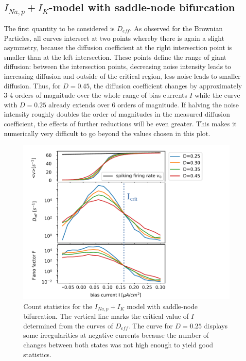 \documentclass[12pt,a4paper]{article}
\begin{document}
\subsection{$I_{Na,p}+I_K$-model with saddle-node bifurcation}
The first quantity to be considered is $D_{eff}$.
As observed for the Brownian Particles, all curves intersect at two points whereby there is again a slight asymmetry, because the diffusion coefficient at the right intersection point is smaller than at the left intersection. These points define the range of giant diffusion: between the intersection points, decreasing noise intensity leads to increasing diffusion and outside of the critical region, less noise leads to smaller diffusion. Thus, for $D=0.45$, the diffusion coefficient changes by approximately 3-4 orders of magnitude over the whole range of bias currents $I$ while the curve with $D=0.25$ already extends over 6 orders of magnitude. If halving the noise intensity roughly doubles the order of magnitudes in the measured diffusion coefficient, the effects of further reductions will be even greater. This makes it numerically very difficult to go beyond the values chosen in this plot.
\begin{figure}[H]
	\centering
	\includegraphics[scale=1]{allfast4.pdf}\caption{Count statistics for the $I_{Na,p}+I_K$ model with saddle-node bifurcation. The vertical line marks the critical value of $I$ determined from the curves of $D_{eff}$. The curve for $D=0.25$ displays some irregularities at negative currents because the number of changes between both states was not high enough to yield good statistics.}
	\label{allreal}
\end{figure}
\end{document}
